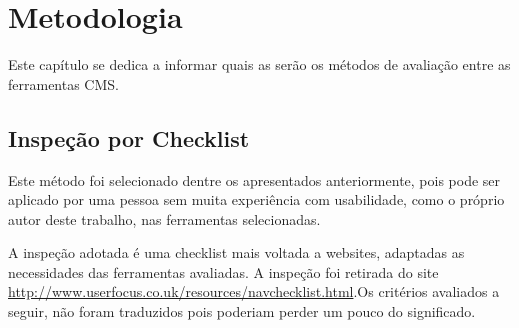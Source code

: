 \chapter{Metodologia}

Este capítulo se dedica a informar quais as serão os métodos de avaliação entre as ferramentas CMS.  

\section{Inspeção por Checklist}

Este método foi selecionado dentre os apresentados anteriormente, pois pode ser aplicado por uma pessoa sem muita experiência com usabilidade, como o próprio autor deste trabalho, nas ferramentas selecionadas.

A inspeção adotada é uma checklist mais voltada a websites, adaptadas as necessidades das ferramentas avaliadas. A inspeção foi retirada do site \url{http://www.userfocus.co.uk/resources/navchecklist.html}.Os critérios avaliados a seguir, não foram traduzidos pois poderiam perder um pouco do significado.

